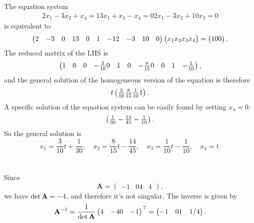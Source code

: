 \documentclass[hyperref, a4paper]{article}
\def\\{}%
\newcommand*{\mat}[1]{\vb{#1}}
\begin{document}
The equation system 
\begin{equation}
    \begin{gathered}
        2 x_1-3 x_2+x_4=1 \\
        3 x_1+x_3-x_4=0 \\
        2 x_1-3 x_2+10 x_3=0
        \end{gathered}
\end{equation}
is equivalent to 
\begin{equation}
    \pmqty{
        2 & -3 & 0 & 1 \\
        3 & 0 & 1 & -1 \\
        2 & -3 & 10 & 0
    } \pmqty{
        x_1 \\ x_2 \\ x_3 \\x_4
    } = \pmqty{
        1 \\ 0 \\ 0
    }.
\end{equation}
The reduced matrix of the LHS is 
\[
    \pmqty{
        1 & 0 & 0 & - \frac{3}{10} \\
        0 & 1 & 0 & - \frac{8}{15} \\
        0 & 0 & 1 & - \frac{1}{10} 
    },
\]
and the general solution of the homogeneous version of the equation is therefore 
\[
    t \pmqty{
        \frac{3}{10} \\ \frac{8}{15} \\ \frac{1}{10} \\ 1
    }.
\]
A specific solution of the equation system can be easily found by setting $x_4 = 0$:
\[
    \pmqty{
        \frac{1}{30} \\ - \frac{14}{45} \\ - \frac{1}{10}
    }.
\]
So the general solution is 
\begin{equation}
    x_1 = \frac{3}{10} t + \frac{1}{30}, \quad 
    x_2 = \frac{8}{15} t - \frac{14}{45}, \quad 
    x_3 = \frac{1}{10} t - \frac{1}{10}, \quad 
    x_4 = t.
\end{equation}

\section{}

Since 
\begin{equation}
    \mathbf{A}=\left(\begin{array}{cc}
        -1 & 0 \\
        4 & 4
        \end{array}\right),
\end{equation}
we have $\det \mat{A} = - 4$, and therefore it's not singular. 
The inverse is given by 
\begin{equation}
    \mat{A}^{-1} = \frac{1}{\det \mat{A}} \pmqty{
        4 & -4 \\ 
        0 & -1
    }^{\top} = \pmqty{
        -1 & 0 \\ 
        1 & 1/4
    }.
\end{equation}
\end{document}
